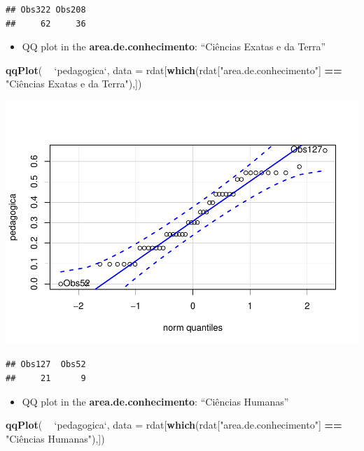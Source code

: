 \documentclass[]{article}
\newenvironment{Shaded}{\begin{snugshade}}{\end{snugshade}}
\newcommand{\DataTypeTok}[1]{\textcolor[rgb]{0.13,0.29,0.53}{#1}}
\newcommand{\KeywordTok}[1]{\textcolor[rgb]{0.13,0.29,0.53}{\textbf{#1}}}
\newcommand{\NormalTok}[1]{#1}
\newcommand{\OperatorTok}[1]{\textcolor[rgb]{0.81,0.36,0.00}{\textbf{#1}}}
\newcommand{\StringTok}[1]{\textcolor[rgb]{0.31,0.60,0.02}{#1}}
\providecommand{\tightlist}{%
  \setlength{\itemsep}{0pt}\setlength{\parskip}{0pt}}
\begin{document}
\begin{verbatim}
## Obs322 Obs208 
##     62     36
\end{verbatim}

\begin{itemize}
\tightlist
\item
  QQ plot in the \textbf{area.de.conhecimento}: ``Ciências Exatas e da
  Terra''
\end{itemize}

\begin{Shaded}
\begin{Highlighting}[]
\KeywordTok{qqPlot}\NormalTok{( }\OperatorTok{~}\StringTok{ `}\DataTypeTok{pedagogica}\StringTok{`}\NormalTok{, }\DataTypeTok{data =}\NormalTok{ rdat[}\KeywordTok{which}\NormalTok{(rdat[}\StringTok{"area.de.conhecimento"}\NormalTok{] }\OperatorTok{==}\StringTok{ "Ciências Exatas e da Terra"}\NormalTok{),])}
\end{Highlighting}
\end{Shaded}

\includegraphics{factorialAnova_files/figure-latex/unnamed-chunk-15-1.pdf}

\begin{verbatim}
## Obs127  Obs52 
##     21      9
\end{verbatim}

\begin{itemize}
\tightlist
\item
  QQ plot in the \textbf{area.de.conhecimento}: ``Ciências Humanas''
\end{itemize}

\begin{Shaded}
\begin{Highlighting}[]
\KeywordTok{qqPlot}\NormalTok{( }\OperatorTok{~}\StringTok{ `}\DataTypeTok{pedagogica}\StringTok{`}\NormalTok{, }\DataTypeTok{data =}\NormalTok{ rdat[}\KeywordTok{which}\NormalTok{(rdat[}\StringTok{"area.de.conhecimento"}\NormalTok{] }\OperatorTok{==}\StringTok{ "Ciências Humanas"}\NormalTok{),])}
\end{Highlighting}
\end{Shaded}
\end{document}

